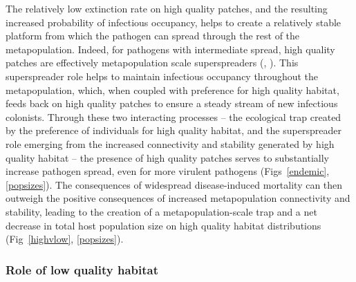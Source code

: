 \documentclass{article}
\begin{document}
The relatively low extinction rate on high quality patches, and the resulting increased probability of infectious occupancy, helps to create a relatively stable platform from which the pathogen can spread through the rest of the metapopulation.
Indeed, for pathogens with intermediate spread, high quality patches are effectively metapopulation scale superspreaders (\cite{Lloyd-Smith2005}, \cite{Paull2012}).  
This superspreader role helps to maintain infectious occupancy throughout the metapopulation, which, when coupled with preference for high quality habitat, feeds back on high quality patches to ensure a steady stream of new infectious colonists. 
Through these two interacting processes -- the ecological trap created by the preference of individuals for high quality habitat, and the superspreader role emerging from the increased connectivity and stability generated by high quality habitat -- the presence of high quality patches serves to substantially increase pathogen spread, even for more virulent pathogens (Figs~\ref{endemic}, \ref{popsizes}).
The consequences of widespread disease-induced mortality can then outweigh the positive consequences of increased metapopulation connectivity and stability, leading to the creation of a metapopulation-scale trap and a net decrease in total host population size on high quality habitat distributions (Fig~\ref{highvlow}, \ref{popsizes}).  

\subsubsection*{Role of low quality habitat}
\end{document}
